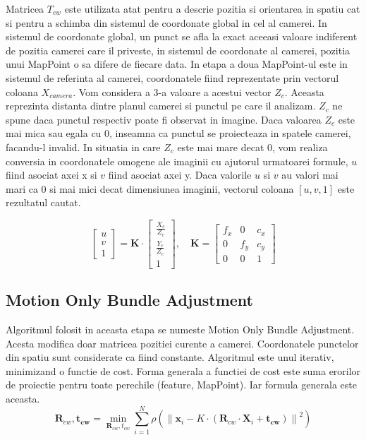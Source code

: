 \documentclass[12pt,a4paper]{report}
\begin{document}
Matricea \(T_{cw}\) este utilizata atat pentru a descrie pozitia si orientarea in spatiu 
cat si pentru a schimba din sistemul de coordonate global in cel al camerei.
In sistemul de coordonate global, un punct se afla la exact aceeasi valoare indiferent 
de pozitia camerei care il priveste, in sistemul de coordonate al camerei, pozitia unui 
MapPoint o sa difere de fiecare data.
In etapa a doua MapPoint-ul este in sistemul de referinta al camerei, 
coordonatele fiind reprezentate prin vectorul coloana \(X_{camera}\). Vom considera 
a 3-a valoare a acestui vector \(Z_c\). Aceasta reprezinta distanta dintre planul camerei
si punctul pe care il analizam. \(Z_c\) ne spune daca punctul respectiv poate fi observat
in imagine. Daca valoarea \(Z_c\) este mai mica sau egala cu 0, inseamna ca punctul 
se proiecteaza in spatele camerei, facandu-l invalid. In situatia in care \(Z_c\) este 
mai mare decat 0, vom realiza conversia in coordonatele omogene ale imaginii cu ajutorul
urmatoarei formule, \(u\) fiind asociat axei x si \(v\) fiind asociat axei y. Daca 
valorile \(u\) si \( v \) au valori mai mari ca 0 si mai mici decat dimensiunea imaginii,
vectorul coloana \([u, v, 1]\) este rezultatul cautat. 

\begin{equation}
    \begin{bmatrix}
        u \\
        v \\
        1
        \end{bmatrix}
        =
        \mathbf{K} \cdot
        \begin{bmatrix}
        \frac{X_c}{Z_c} \\
        \frac{Y_c}{Z_c} \\
        1 
        \end{bmatrix}, \quad{}
        \mathbf{K} =
        \begin{bmatrix}
        f_x & 0 & c_x \\
        0 & f_y & c_y \\
        0 & 0 & 1
        \end{bmatrix}
\end{equation} 


\subsection{Motion Only Bundle Adjustment}
Algoritmul folosit in aceasta etapa se numeste Motion Only Bundle Adjustment. Acesta 
modifica doar matricea pozitiei curente a camerei. Coordonatele punctelor din spatiu sunt
considerate ca fiind constante. Algoritmul este unul iterativ, minimizand o functie de cost.
Forma generala a functiei de cost este suma erorilor de proiectie pentru toate perechile
(feature, MapPoint). Iar formula generala este aceasta.
 \begin{equation}
    \mathbf{R}_{cw}, \mathbf{t_{cw}} = \min_{\mathbf{R}_{cw}, t_{cw}} \sum_{i=1}^{N} \rho\left( \left\| \mathbf{x}_i - K \cdot \left( \mathbf{R}_{cw} \cdot \mathbf{X}_i + \mathbf{t_{cw}} \right) \right\|^2 \right)
\end{equation}
\end{document}
